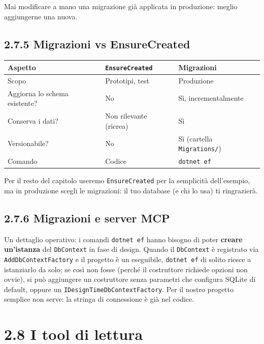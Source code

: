 \documentclass[
  italian,
  10pt,
]{book}
\begin{document}
Mai modificare a mano una migrazione già applicata in produzione: meglio
aggiungerne una nuova.

\subsection{2.7.5 Migrazioni vs
EnsureCreated}\label{migrazioni-vs-ensurecreated}

\small
\begin{longtable}[]{@{}>{\raggedright\arraybackslash}p{}>{\raggedright\arraybackslash}p{}>{\raggedright\arraybackslash}p{}@{}}
\toprule\noalign{}
Aspetto & \texttt{EnsureCreated} & Migrazioni \\
\midrule\noalign{}
\endhead
\bottomrule\noalign{}
\endlastfoot
Scopo & Prototipi, test & Produzione \\
Aggiorna lo schema esistente? & No & Sì, incrementalmente \\
Conserva i dati? & Non rilevante (ricrea) & Sì \\
Versionabile? & No & Sì (cartella \texttt{Migrations/}) \\
Comando & Codice & \texttt{dotnet\ ef} \\
\end{longtable}
\normalsize

Per il resto del capitolo useremo \texttt{EnsureCreated} per la
semplicità dell'esempio, ma in produzione scegli le migrazioni: il tuo
database (e chi lo usa) ti ringrazierà.

\subsection{2.7.6 Migrazioni e server
MCP}\label{migrazioni-e-server-mcp}

Un dettaglio operativo: i comandi \texttt{dotnet\ ef} hanno bisogno di
poter \textbf{creare un'istanza} del \texttt{DbContext} in fase di
design. Quando il \texttt{DbContext} è registrato via
\texttt{AddDbContextFactory} e il progetto è un eseguibile,
\texttt{dotnet\ ef} di solito riesce a istanziarlo da solo; se così non
fosse (perché il costruttore richiede opzioni non ovvie), si può
aggiungere un costruttore senza parametri che configura SQLite di
default, oppure un \texttt{IDesignTimeDbContextFactory}. Per il nostro
progetto semplice non serve: la stringa di connessione è già nel codice.

\section{2.8 I tool di lettura}\label{i-tool-di-lettura}
\end{document}

